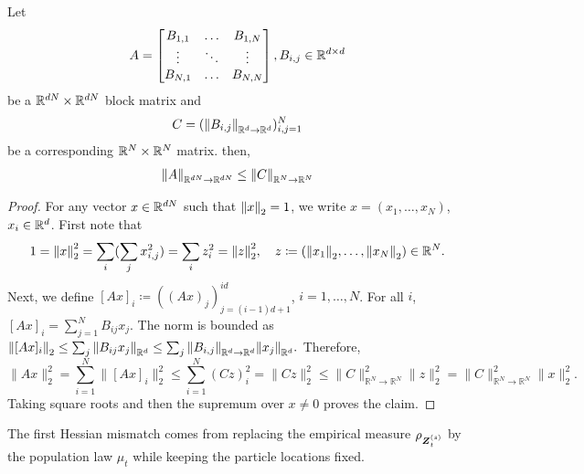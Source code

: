\begin{lemma}
\label{lemma-operator-norm-block-matrix}
    Let 
    \begin{equation}
        A = \begin{bmatrix}
            B_{1,1} & \dots& B_{1,N}\\
            \vdots &\ddots & \vdots \\
            B_{N,1}& \dots &B_{N,N}
        \end{bmatrix},
        B_{i,j} \in \mathbb{R}^{d\times d}
    \end{equation}
    be a $\mathbb{R}^{dN}\times \mathbb{R}^{dN}$ block matrix and
    \begin{equation}
        C = (\norm{B_{i,j}}_{\mathbb R^d\to\mathbb R^d})_{i,j=1}^N
    \end{equation}
    be a corresponding $\mathbb{R}^{N}\times \mathbb{R}^{N}$ matrix.
    then,
    \begin{equation}
        \norm{A}_{\mathbb R^{dN}\to\mathbb R^{dN}} \leq \norm{C}_{\mathbb R^{N}\to\mathbb R^{N}}
    \end{equation}
\end{lemma}
\begin{proof}
    For any vector $x\in \mathbb{R}^{dN}$ such that $\norm{x}_2=1$, we write $x = (x_1,\dots,x_N)$, $x_i\in \mathbb{R}^d$.
    First note that
    \begin{equation}
        1 = \norm{x}_2^2 = \sum_i (\sum_j x^2_{i,j}) = \sum_i z_i^2 = \norm{z}_2^2,\quad z \coloneq (\norm{x_1}_2,\dots,\norm{x_N}_2) \in \mathbb{R}^N.
    \end{equation}
    Next, we define $[Ax]_i \coloneq ((Ax)_j)_{j=(i-1)d+1}^{id}$, $i=1,\dots,N$. For all $i$, $[Ax]_i = \sum_{j=1}^N B_{ij}x_j.$
    The norm is bounded as $\norm{[Ax]_i}_2\leq \sum_j \norm{B_{ij}x_j}_{\mathbb R^d} \leq \sum_j \norm{B_{i,j}}_{\mathbb R^d\to\mathbb R^d}\norm{x_j}_{\mathbb R^d}.$
    Therefore,
\begin{equation}
    \|Ax\|_2^2
    =
    \sum_{i=1}^N\|[Ax]_i\|_2^2 
    \le
    \sum_{i=1}^N (Cz)_i^2
    =
    \|Cz\|_2^2 
    \le
    \|C\|_{\mathbb R^{N}\to\mathbb R^{N}}^2\|z\|_2^2
    =
    \|C\|_{\mathbb R^{N}\to\mathbb R^{N}}^2\|x\|_2^2.
\end{equation}
Taking square roots and then the supremum over \(x\neq0\) proves the claim.
\end{proof}

The first Hessian mismatch comes from replacing the empirical measure
\(\rho_{\boldsymbol{Z}_t^{(s)}}\) by the population law \(\mu_t\) while keeping the particle locations fixed.

